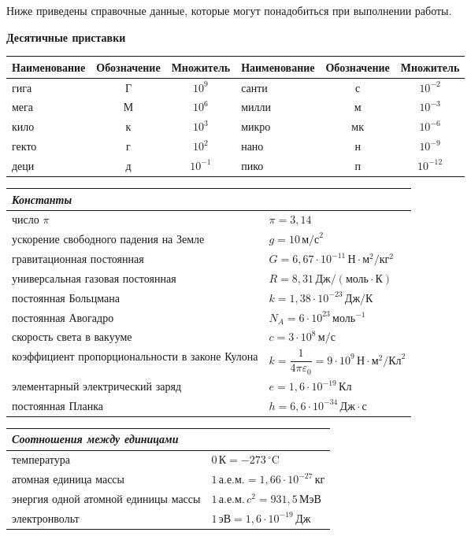\noindent Ниже приведены справочные данные, которые могут понадобиться при выполнении работы.
\begin{center}\bfseries Десятичные приставки\end{center}
\noindent\begin{tabularx}{\linewidth}{|X|c|c|X|c|c|}\hline
Наименование & Обозначение & Множитель & Наименование & Обозначение & Множитель\\\hline
гига & Г & $10^9$ & санти & с & $10^{-2}$\\\hline
мега & М & $10^6$ & милли & м & $10^{-3}$\\\hline
кило & к & $10^3$ & микро & мк & $10^{-6}$\\\hline
гекто & г & $10^2$ & нано & н & $10^{-9}$\\\hline
деци & д & $10^{-1}$ & пико & п & $10^{-12}$\\\hline
\end{tabularx}
\par\smallskip
\noindent\begin{tabularx}{\linewidth}{|X|>{\raggedright\arraybackslash}p{.42\linewidth}|}\hline
\multicolumn{2}{|l|}{\textbf{\itshape Константы}}\\\hline
число $\pi$ & $\pi=3{,}14$\\
ускорение свободного падения на Земле & $g=10\,\text{м/с}^2$\\
гравитационная постоянная & $G=6{,}67\cdot10^{-11}\,\text{Н}\cdot\text{м}^2/\text{кг}^2$\\
универсальная газовая постоянная & $R=8{,}31\,\text{Дж}/(\text{моль}\cdot\text{К})$\\
постоянная Больцмана & $k=1{,}38\cdot10^{-23}\,\text{Дж/К}$\\
постоянная Авогадро & $N_A=6\cdot10^{23}\,\text{моль}^{-1}$\\
скорость света в вакууме & $c=3\cdot10^8\,\text{м/с}$\\
коэффициент пропорциональности в законе Кулона & $k=\dfrac{1}{4\pi\varepsilon_0}=9\cdot10^9\,\text{Н}\cdot\text{м}^2/\text{Кл}^2$\\
элементарный электрический заряд & $e=1{,}6\cdot10^{-19}\,\text{Кл}$\\
постоянная Планка & $h=6{,}6\cdot10^{-34}\,\text{Дж}\cdot\text{с}$\\\hline
\end{tabularx}
\par\smallskip
\noindent\begin{tabularx}{\linewidth}{|X|X|}\hline
\multicolumn{2}{|l|}{\textbf{\itshape Соотношения между единицами}}\\\hline
температура & $0\,\text{К}=-273\,^{\circ}\text{C}$\\
атомная единица массы & $1\,\text{а.е.м.}=1{,}66\cdot10^{-27}\,\text{кг}$\\
энергия одной атомной единицы массы & $1\,\text{а.е.м.}\,c^2=931{,}5\,\text{МэВ}$\\
электронвольт & $1\,\text{эВ}=1{,}6\cdot10^{-19}\,\text{Дж}$\\\hline
\end{tabularx}
